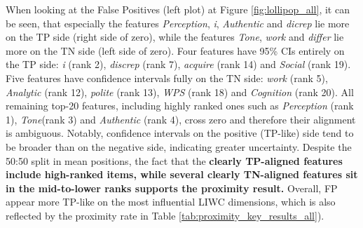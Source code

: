 When looking at the False Positives (left plot) at Figure \ref{fig:lollipop_all}, it can be seen, that especially the features \textit{Perception}, \textit{i}, \textit{Authentic} and \textit{dicrep} lie more on the TP side (right side of zero), while the features \textit{Tone}, \textit{work} and \textit{differ} lie more on the TN side (left side of zero).  
Four features have 95\% CIs entirely on the TP side: \textit{i} (rank 2), \textit{discrep} (rank 7), \textit{acquire} (rank 14) and \textit{Social} (rank 19). Five features have confidence intervals fully on the TN side: \textit{work} (rank 5), \textit{Analytic} (rank 12), \textit{polite} (rank 13), \textit{WPS} (rank 18) and \textit{Cognition} (rank 20). All remaining top-20 features, including highly ranked ones such as \textit{Perception} (rank 1), \textit{Tone}(rank 3) and \textit{Authentic} (rank 4), cross zero and therefore their alignment is ambiguous. Notably, confidence intervals on the positive (TP-like) side tend to be broader than on the negative side, indicating greater uncertainty. Despite the 50:50 split in mean positions, the fact that the \textbf{clearly TP-aligned features include high-ranked items, while several clearly TN-aligned features sit in the mid-to-lower ranks supports the proximity result.} Overall, FP appear more TP-like on the most influential LIWC dimensions, which is also reflected by the proximity rate in Table \ref{tab:proximity_key_results_all}).


